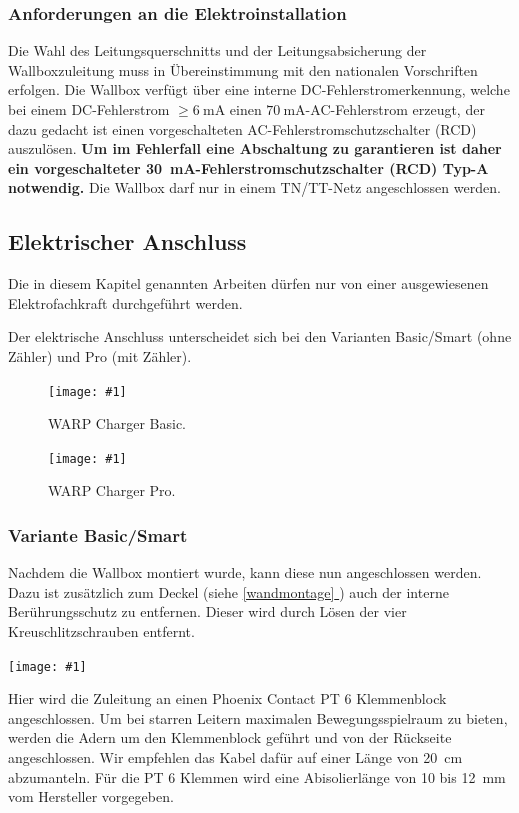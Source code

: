 \documentclass[a4paper,10pt]{article}
\newcommand{\hint}[1]{\begin{tcolorbox}[colback=boxgray,colframe=black,coltext=
white,title=Hinweis]#1\end{tcolorbox}}
\newcommand{\gfx}[1]{\texttt{[image: \#1]}}
\newcommand*{\fullref}[1]{\hyperref[{#1}]{\ref*{#1} \nameref*{#1}}}
\begin{document}
\begin{multicols*}{2}
	\subsubsection{Anforderungen an die Elektroinstallation}
	Die Wahl des Leitungsquerschnitts und der Leitungsabsicherung der
	Wallboxzuleitung muss in Übereinstimmung mit den nationalen Vorschriften
	erfolgen. Die Wallbox verfügt über eine interne DC-Fehlerstromerkennung, welche
	bei einem DC-Fehlerstrom $\geq \SI{6}{\milli\ampere}$ einen
	$\SI{70}{\milli\ampere}$-AC-Fehlerstrom erzeugt, der dazu gedacht ist einen
	vorgeschalteten AC-Fehlerstromschutzschalter (RCD) auszulösen.
	\textbf{Um im Fehlerfall eine Abschaltung zu garantieren ist daher ein vorgeschalteter
		\SI{30}{\milli\ampere}-Fehlerstromschutzschalter (RCD) Typ-A notwendig.} Die Wallbox darf nur in einem TN/TT-Netz angeschlossen
	werden.

	\newpage
	\subsection{Elektrischer Anschluss}
	\hint{Die in diesem Kapitel genannten Arbeiten dürfen nur von einer ausgewiesenen
		Elektrofachkraft durchgeführt werden.}
	Der elektrische Anschluss unterscheidet sich bei den Varianten Basic/Smart
	(ohne Zähler) und Pro (mit Zähler).

	\begin{figure}[H]
		\gfx{./img/resized/warp_basic_inlay_ready}
		\caption*{WARP Charger Basic.}
	\end{figure}

	\begin{figure}[H]
		\gfx{./img/resized/warp_pro_inlay_ready}
		\caption*{WARP Charger Pro.}
	\end{figure}

	\subsubsection{Variante Basic/Smart}
	Nachdem die Wallbox montiert wurde, kann diese nun angeschlossen werden. Dazu
	ist zusätzlich zum Deckel (siehe \fullref{wandmontage}) auch der interne
	Berührungsschutz zu entfernen. Dieser wird durch Lösen der vier
	Kreuschlitzschrauben entfernt.

	\gfx{./img/resized/warp_cable_cut_ready}

	Hier wird die Zuleitung an einen Phoenix Contact PT 6 Klemmenblock
	angeschlossen. Um bei starren Leitern maximalen Bewegungsspielraum zu bieten,
	werden die Adern um den Klemmenblock geführt und von der Rückseite
	angeschlossen. Wir empfehlen das Kabel dafür auf einer Länge von
	\SI{20}{\centi\meter} abzumanteln. Für die PT 6 Klemmen wird eine
	Abisolierlänge von 10 bis \SI{12}{\milli\meter} vom Hersteller vorgegeben.


\end{multicols*}
\end{document}
